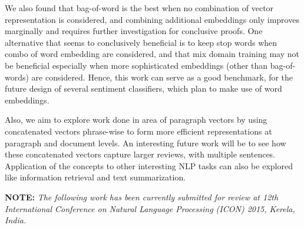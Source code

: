 We also found that bag-of-word is the best when no combination of vector representation is considered, and combining additional embeddings only improves marginally and requires further investigation for conclusive proofs. One alternative that seems to conclusively beneficial is to keep stop words when combo of word embedding are considered, and that mix domain training may not be beneficial especially when more sophisticated embeddings (other than bag-of-words) are considered. Hence, this work can serve as a good benchmark, for the future design of several sentiment classifiers, which plan to make use of word embeddings. 

Also, we aim to explore work done in area of paragraph vectors \parencite{paragraphvectors} by using concatenated vectors phrase-wise to form more efficient representations at paragraph and document levels. An interesting future work will be to see how these concatenated vectors capture larger reviews, with multiple sentences.
Application of the concepts to other interesting NLP tasks can also be explored like information retrieval and text summarization.  
\newline

\textbf{NOTE:} \textit{The following work has been currently submitted for review at 12th International Conference on Natural Language Processing (ICON) 2015, Kerela, India.}